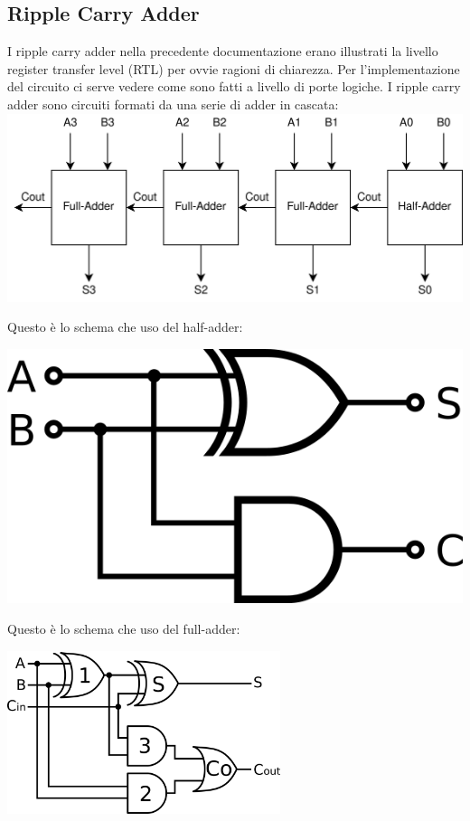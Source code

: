 \documentclass[12pt, letterpaper]{article}
\begin{document}
\subsection{Ripple Carry Adder}

I ripple carry adder nella precedente documentazione erano illustrati la livello register transfer level (RTL) per ovvie ragioni di chiarezza.
Per l'implementazione del circuito ci serve vedere come sono fatti a livello di porte logiche.  
I ripple carry adder sono circuiti formati da una serie di adder in cascata:
\includegraphics[width=\textwidth]{ripple_carry_adder}

Questo è lo schema che uso del half-adder:
\begin{center}
\includegraphics{half_adder}
\end{center}

Questo è lo schema che uso del full-adder:
\begin{center}
\includegraphics[width=8cm]{full_adder}
\end{center}
\end{document}
